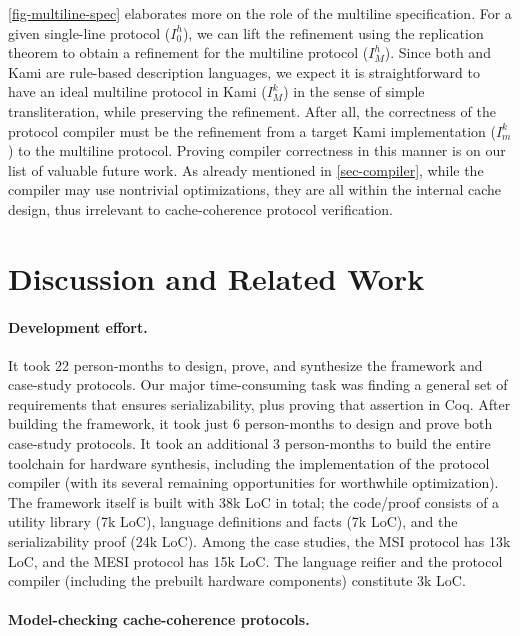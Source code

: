 \documentclass[sigplan,10pt,review,anonymous,screen]{acmart}\settopmatter{printfolios=true,printccs=false,printacmref=false}
\begin{document}
\autoref{fig-multiline-spec} elaborates more on the role of the multiline specification.
For a given \hemiola{} single-line protocol ($I^{h}_{0}$), we can lift the refinement using the replication theorem to obtain a refinement for the multiline protocol ($I^{h}_{M}$).
Since both \hemiola{} and Kami are rule-based description languages, we expect it is straightforward to have an ideal multiline protocol in Kami ($I^{k}_{M}$) in the sense of simple transliteration, while preserving the refinement.
After all, the correctness of the protocol compiler must be the refinement from a target Kami implementation ($I^{k}_{m}$) to the multiline protocol.
Proving compiler correctness in this manner is on our list of valuable future work.
As already mentioned in \autoref{sec-compiler}, while the compiler may use nontrivial optimizations, they are all within the internal cache design, thus irrelevant to cache-coherence protocol verification.

\section{Discussion and Related Work}
\label{sec-discussion}

\paragraph{Development effort.}
It took 22 person-months to design, prove, and synthesize the framework and case-study protocols.
Our major time-consuming task was finding a general set of requirements that ensures serializability, plus proving that assertion in Coq.
After building the framework, it took just 6 person-months to design and prove both case-study protocols.
It took an additional 3 person-months to build the entire toolchain for hardware synthesis, including the implementation of the protocol compiler (with its several remaining opportunities for worthwhile optimization).
The framework itself is built with 38k LoC in total; the code/proof consists of a utility library (7k LoC), language definitions and facts (7k LoC), and the serializability proof (24k LoC).
Among the case studies, the MSI protocol has 13k LoC, and the MESI protocol has 15k LoC.
The \hemiola{} language reifier and the protocol compiler (including the prebuilt hardware components) constitute 3k LoC.

\paragraph{Model-checking cache-coherence protocols.}
\end{document}
